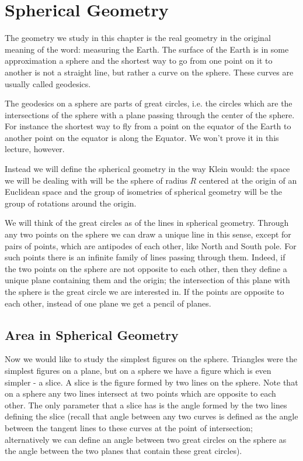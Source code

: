 \chapter{Spherical Geometry}

The geometry we study in this chapter is the real geometry in the original meaning of the word: measuring the Earth. The surface of the Earth is in some approximation a sphere and the shortest way to go from one point on it to another is not a straight line, but rather a curve on the sphere. These curves are usually called geodesics.

The geodesics on a sphere are parts of great circles, i.e. the circles which are the intersections of the sphere with a plane passing through the center of the sphere. For instance the shortest way to fly from a point on the equator of the Earth to another point on the equator is along the Equator. We won't prove it in this lecture, however.

Instead we will define the spherical geometry in the way Klein would: the space we will be dealing with will be the sphere of radius $R$ centered at the origin of an Euclidean space and the group of isometries of spherical geometry will be the group of rotations around the origin.

We will think of the great circles as of the lines in spherical geometry. Through any two points on the sphere we can draw a unique line in this sense, except for pairs of points, which are antipodes of each other, like North and South pole. For such points there is an infinite family of lines passing through them. Indeed, if the two points on the sphere are not opposite to each other, then they define a unique plane containing them and the origin; the intersection of this plane with the sphere is the great circle we are interested in. If the points are opposite to each other, instead of one plane we get a pencil of planes.

\section{Area in Spherical Geometry}

Now we would like to study the simplest figures on the sphere. Triangles were the simplest figures on a plane, but on a sphere we have a figure which is even simpler - a slice. A slice is the figure formed by two lines on the sphere. Note that on a sphere any two lines intersect at two points which are opposite to each other. The only parameter that a slice has is the angle formed by the two lines defining the slice (recall that angle between any two curves is defined as the angle between the tangent lines to these curves at the point of intersection; alternatively we can define an angle between two great circles on the sphere as the angle between the two planes that contain these great circles).

